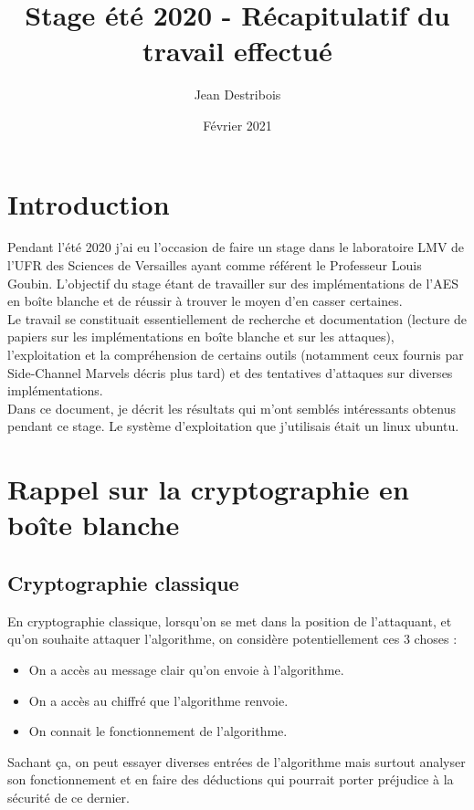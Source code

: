 \documentclass[10pt,a4paper]{article}
\author{Jean Destribois}
\title{Stage été 2020 - Récapitulatif du travail effectué}
\date{Février 2021}
\begin{document}
\maketitle

\vspace{2cm}
\tableofcontents

\newpage

\section{Introduction}
Pendant l'été 2020 j'ai eu l'occasion de faire un stage dans le laboratoire LMV de l'UFR des Sciences de Versailles ayant comme référent le Professeur Louis Goubin. L'objectif du stage étant de travailler sur des implémentations de l'AES en boîte blanche et de réussir à trouver le moyen d'en casser certaines.
\\
Le travail se constituait essentiellement de recherche et documentation (lecture de papiers sur les implémentations en boîte blanche et sur les attaques), l'exploitation et la compréhension de certains outils (notamment ceux fournis par Side-Channel Marvels décris plus tard) et des tentatives d'attaques sur diverses implémentations.
\\
Dans ce document, je décrit les résultats qui m'ont semblés intéressants obtenus pendant ce stage. Le système d'exploitation que j'utilisais était un linux ubuntu. 

\section{Rappel sur la cryptographie en boîte blanche}
\subsection{Cryptographie classique}
En cryptographie classique, lorsqu'on se met dans la position de l'attaquant, et qu'on souhaite attaquer l'algorithme, on considère potentiellement ces 3 choses :
\begin{itemize}
\item On a accès au message clair qu'on envoie à l'algorithme.
\item On a accès au chiffré que l'algorithme renvoie.
\item On connait le fonctionnement de l'algorithme.
\end{itemize}
Sachant ça, on peut essayer diverses entrées de l'algorithme mais surtout analyser son fonctionnement et en faire des déductions qui pourrait porter préjudice à la sécurité de ce dernier.
\end{document}
